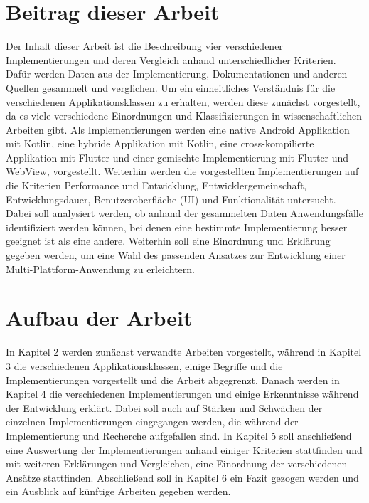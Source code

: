 \section{Beitrag dieser Arbeit}
Der Inhalt dieser Arbeit ist die Beschreibung vier verschiedener Implementierungen und deren Vergleich anhand unterschiedlicher Kriterien. Dafür werden Daten aus der Implementierung, Dokumentationen und anderen Quellen gesammelt und verglichen.
Um ein einheitliches Verständnis für die verschiedenen Applikationsklassen zu erhalten, werden diese zunächst vorgestellt, da es viele verschiedene Einordnungen und Klassifizierungen in wissenschaftlichen Arbeiten gibt.
Als Implementierungen werden eine native Android Applikation mit Kotlin, eine hybride Applikation mit Kotlin, eine cross-kompilierte Applikation mit Flutter und einer gemischte Implementierung mit Flutter und WebView, vorgestellt. 
Weiterhin werden die vorgestellten Implementierungen auf die Kriterien Performance und Entwicklung, Entwicklergemeinschaft, Entwicklungsdauer, Benutzeroberfläche (UI) und Funktionalität untersucht.
Dabei soll analysiert werden, ob anhand der gesammelten Daten Anwendungsfälle identifiziert werden können, bei denen eine bestimmte Implementierung besser geeignet ist als eine andere. Weiterhin soll eine Einordnung und Erklärung gegeben werden, um eine Wahl des passenden Ansatzes zur Entwicklung einer Multi-Plattform-Anwendung zu erleichtern.


\section{Aufbau der Arbeit}
In Kapitel 2 werden zunächst verwandte Arbeiten vorgestellt, während in Kapitel 3 die verschiedenen Applikationsklassen, einige Begriffe und die Implementierungen vorgestellt und die Arbeit abgegrenzt.
Danach werden in Kapitel 4 die verschiedenen Implementierungen und einige Erkenntnisse während der Entwicklung erklärt. Dabei soll auch auf Stärken und Schwächen der einzelnen Implementierungen eingegangen werden, die während der Implementierung und Recherche aufgefallen sind.
In Kapitel 5 soll anschließend eine Auswertung der Implementierungen anhand einiger Kriterien stattfinden und mit weiteren Erklärungen und Vergleichen, eine Einordnung der verschiedenen Ansätze stattfinden. Abschließend soll in Kapitel 6 ein Fazit gezogen werden und ein Ausblick auf künftige Arbeiten gegeben werden.